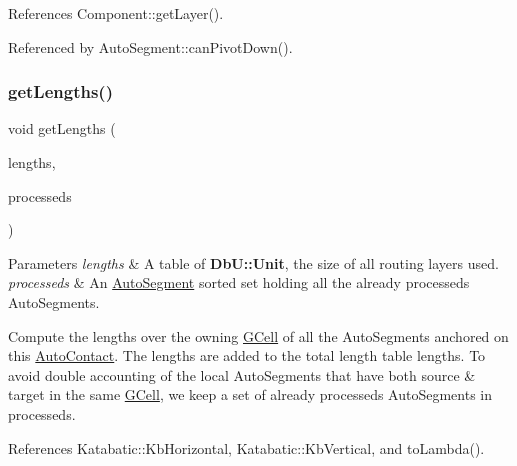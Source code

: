 References Component\+::get\+Layer().



Referenced by Auto\+Segment\+::can\+Pivot\+Down().

\mbox{\label{classKatabatic_1_1AutoContact_ac607a624c0698056c5bccf405cf05ea7}} 
\subsubsection{\texorpdfstring{get\+Lengths()}{getLengths()}}
{\footnotesize\ttfamily void get\+Lengths (\begin{DoxyParamCaption}\item[{\textbf{ Db\+U\+::\+Unit} $\ast$}]{lengths,  }\item[{Auto\+Segment\+::\+Depth\+Length\+Set \&}]{processeds }\end{DoxyParamCaption})}


\begin{DoxyParams}{Parameters}
{\em lengths} & A table of \textbf{ Db\+U\+::\+Unit}, the size of all routing layers used. \\
\hline
{\em processeds} & An \mbox{\hyperlink{classKatabatic_1_1AutoSegment}{Auto\+Segment}} sorted set holding all the already processeds Auto\+Segments.\\
\hline
\end{DoxyParams}
Compute the lengths over the owning \mbox{\hyperlink{classKatabatic_1_1GCell}{G\+Cell}} of all the Auto\+Segments anchored on this \mbox{\hyperlink{classKatabatic_1_1AutoContact}{Auto\+Contact}}. The lengths are added to the total length table {\ttfamily lengths}. To avoid double accounting of the local Auto\+Segments that have both source \& target in the same \mbox{\hyperlink{classKatabatic_1_1GCell}{G\+Cell}}, we keep a set of already processeds Auto\+Segments in {\ttfamily processeds}. 

References Katabatic\+::\+Kb\+Horizontal, Katabatic\+::\+Kb\+Vertical, and to\+Lambda().

\mbox{\label{classKatabatic_1_1AutoContact_a00ed934305dd186a284b7a13b5798cb6}} 
